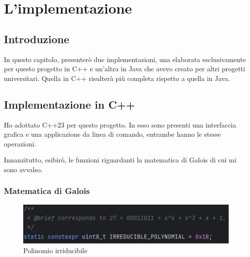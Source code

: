 
\chapter{L'implementazione}



\section{Introduzione}

 

\textsf{\small In questo capitolo, presenterò due implementazioni, una elaborata esclusivamente per questo progetto in C++ e un'altra in Java che avevo creato per altri progetti universitari. Quella in C++ risulterà più completa rispetto a quella in Java.}


\section{Implementazione in C++}

 

\textsf{\small Ho adottato C++23 per questo progetto. In esso sono presenti una interfaccia grafica e una applicazione da linea di comando, entrambe hanno le stesse operazioni.}


\textsf{\small Innanzitutto, esibirò, le funzioni riguardanti la matematica di Galois di cui mi sono avvalso.}

\subsection{Matematica di Galois}

 

\begin{figure}[H]
	\centering
	\includegraphics[width=1\textwidth, height=1\textheight, keepaspectratio]{./images/code/cpp/galois_math/irreducible_polynomial.PNG}
	\caption{Polinomio irriducibile}
	\label{fig:irreducible_polynomial}
\end{figure}

